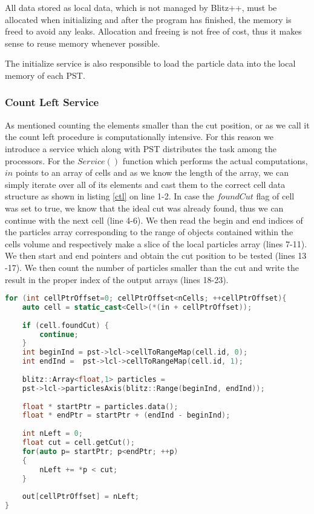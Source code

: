\documentclass[]{article}
\begin{document}
All data stored as local data, which is not managed by Blitz++, must be allocated when initializing and after the program has finished, the memory is freed to avoid any leaks. Allocation and freeing is not free of cost, thus it makes sense to reuse memory whenever possible. 

The initialize service is also responsible to load the particle data into the local memory of each PST. 

\subsubsection{Count Left Service}

As mentioned counting the elements smaller than the cut position, or as we call it the count left procedure is computationally intensive. For this reason we introduce a service which along with PST distributes the task among the processors. 
For the $Service()$ function which performs the actual computations, $in$ points to an array of cells and as we know the length of the array, we can simply iterate over all of its elements and cast them to the correct cell data structure as shown in listing \ref{ctl} on line 1-2. In case the $foundCut$ flag of cell was set to true, we know that the ideal cut was already found, thus we can continue with the next cell (line 4-6).
We then read the begin and end indices of the particles array corresponding to the range of objects contained within the cells volume and respectively make a slice of the local particles array (lines 7-11). We then start and end pointers and obtain the cut position to be tested (lines 13 -17). We then count the number of particles smaller than the cut and write the result in the proper index of the output arrays (lines 18-23).   


\begin{lstlisting}[language=c++, caption=Part of the Count Left Service() method, label=ctl]
for (int cellPtrOffset=0; cellPtrOffset<nCells; ++cellPtrOffset){
	auto cell = static_cast<Cell>(*(in + cellPtrOffset));
	
	if (cell.foundCut) {
		continue;
	}
	int beginInd = pst->lcl->cellToRangeMap(cell.id, 0);
	int endInd =  pst->lcl->cellToRangeMap(cell.id, 1);
	
	blitz::Array<float,1> particles =
	pst->lcl->particlesAxis(blitz::Range(beginInd, endInd));
	
	float * startPtr = particles.data();
	float * endPtr = startPtr + (endInd - beginInd);
	
	int nLeft = 0;
	float cut = cell.getCut();
	for(auto p= startPtr; p<endPtr; ++p)
	{
		nLeft += *p < cut;
	}
	
	out[cellPtrOffset] = nLeft;
}
\end{lstlisting}
\end{document}
